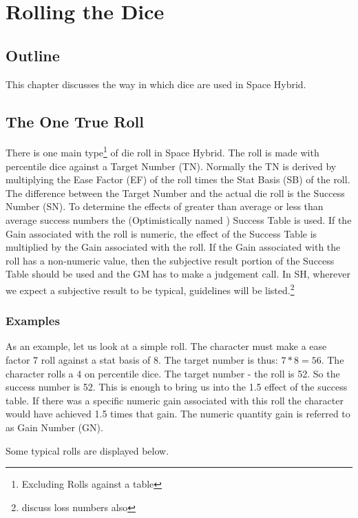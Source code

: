 \chapter{Rolling the Dice}

\section{Outline}
This chapter discusses the way in which dice are used in Space Hybrid.

\section{The One True Roll}
There is one main type\footnote{Excluding Rolls against a table}
of die roll in Space Hybrid. The roll is made
with percentile dice against a Target Number (TN). Normally the TN is
derived by multiplying the Ease Factor (EF) of the roll times the 
Stat Basis (SB) of the roll. The difference between the Target Number 
and the actual die roll is the Success Number (SN). To determine the 
effects of greater than average or less than average success numbers 
the (Optimistically named ) Success Table is used. If the Gain 
associated with the roll is numeric, the effect of the Success Table 
is multiplied by the Gain associated with the roll.  If the Gain 
associated with the roll has a non-numeric value, then the subjective 
result portion of the Success Table should be used and the GM has to 
make a judgement call. In SH, wherever we expect a subjective result 
to be typical, guidelines will be listed.\footnote{discuss loss 
numbers also} 



\subsection{Examples}
As an example, let us look at a simple roll. The character must make a
ease factor 7 roll against a stat basis of 8. The target number is
thus: \(7*8 = 56\). The character rolls a 4 on percentile dice. The target
number - the roll is 52. So the success number is 52. This is enough to
bring us into the 1.5 effect of the success table. If there was a
specific numeric gain associated with this roll the character would
have achieved 1.5 times that gain. The numeric quantity gain is
referred to as Gain Number (GN).

Some typical rolls are displayed below.

